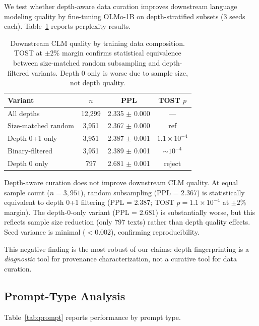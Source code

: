 \documentclass[11pt,a4paper]{article}
\begin{document}
We test whether depth-aware data curation improves downstream language modeling quality by fine-tuning OLMo-1B on depth-stratified subsets (3 seeds each). Table~\ref{tab:downstream} reports perplexity results.

\begin{table}[t]
\centering
\small
\begin{tabular}{lccc}
\toprule
\textbf{Variant} & \textbf{$n$} & \textbf{PPL} & \textbf{TOST $p$} \\
\midrule
All depths & 12,299 & 2.335 $\pm$ 0.000 & --- \\
Size-matched random & 3,951 & 2.367 $\pm$ 0.000 & ref \\
Depth 0+1 only & 3,951 & 2.387 $\pm$ 0.001 & $1.1{\times}10^{-4}$ \\
Binary-filtered & 3,951 & 2.389 $\pm$ 0.001 & ${\sim}10^{-4}$ \\
Depth 0 only & 797 & 2.681 $\pm$ 0.001 & reject \\
\bottomrule
\end{tabular}
\caption{Downstream CLM quality by training data composition. TOST at $\pm 2\%$ margin confirms statistical equivalence between size-matched random subsampling and depth-filtered variants. Depth 0 only is worse due to sample size, not depth quality.}
\label{tab:downstream}
\end{table}

Depth-aware curation does not improve downstream CLM quality. At equal sample count ($n = 3{,}951$), random subsampling (PPL = 2.367) is statistically equivalent to depth 0+1 filtering (PPL = 2.387; TOST $p = 1.1 \times 10^{-4}$ at $\pm 2\%$ margin). The depth-0-only variant (PPL = 2.681) is substantially worse, but this reflects sample size reduction (only 797 texts) rather than depth quality effects. Seed variance is minimal ($< 0.002$), confirming reproducibility.

This negative finding is the most robust of our claims: depth fingerprinting is a \textit{diagnostic} tool for provenance characterization, not a curative tool for data curation.

\subsection{Prompt-Type Analysis}
\label{sec:prompt}

Table~\ref{tab:prompt} reports performance by prompt type.
\end{document}
